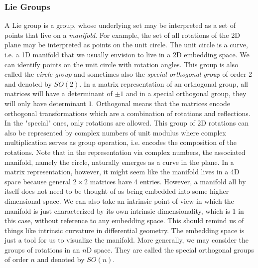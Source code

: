 

\subsubsection{Lie Groups}
A Lie group is a group, whose underlying set may be interpreted as a set of points that live on a \emph{manifold}. For example, the set of all rotations of the 2D plane may be interpreted as points on the unit circle. The unit circle is a curve, i.e. a 1D manifold that we usually envision to live in a 2D embedding space. We can identify points on the unit circle with rotation angles. This group is also called the \emph{circle group} and sometimes also the \emph{special orthogonal group} of order 2 and denoted by $SO(2)$. In a matrix representation of an orthogonal group, all matrices will have a determinant of $\pm 1$ and in a special orthogonal group, they will only have determinant $1$. Orthogonal means that the matrices encode orthogonal transformations which are a combination of rotations and reflections. In the "special" ones, only rotations are allowed. This group of 2D rotations can also be represented by complex numbers of unit modulus where complex multiplication serves as group operation, i.e. encodes the composition of the rotations. Note that in the representation via complex numbers, the associated manifold, namely the circle, naturally emerges as a curve in the plane. In a matrix representation, however, it might seem like the manifold lives in a 4D space because general $2 \times 2$ matrices have 4 entries. However, a manifold all by itself does not need to be thought of as being embedded into some higher dimensional space. We can also take an intrinsic point of view in which the manifold is just characterized by its own intrinsic dimensionality, which is 1 in this case, without reference to any embedding space. This should remind us of things like intrinsic curvature in differential geometry. The embedding space is just a tool for us to visualize the manifold. More generally, we may consider the groups of rotations in an $n$D space. They are called the special orthogonal groups of order $n$ and denoted by $SO(n)$. 



